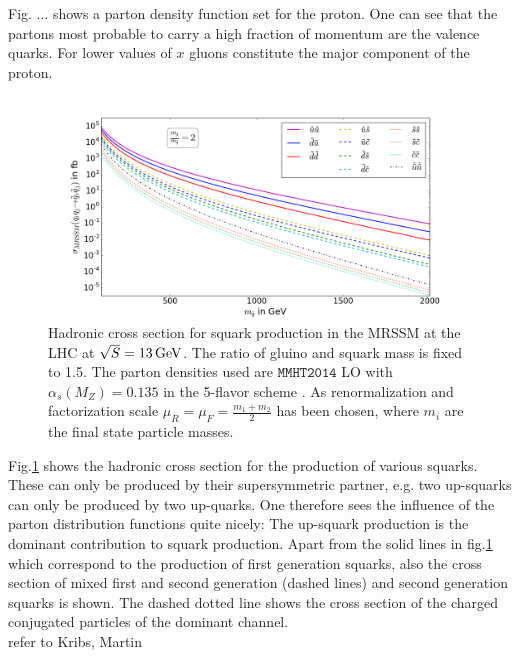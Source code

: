 Fig. ... shows a parton density function set for the proton. One can see that the partons most probable to carry a high fraction of momentum are the valence quarks. For lower values of $x$ gluons constitute the major component of the proton.\\
\begin{figure}[!htpb]
\begin{center}
\includegraphics[scale=.45]{figures/MRSSM:q+q->sq+sq_mr=2_seperated}
\caption{Hadronic cross section for squark production in the MRSSM at the LHC at $\sqrt{S} = \unit[13]{GeV}$. The ratio of gluino and squark mass is fixed to 1.5. The parton densities used are $\mathtt{MMHT2014}$ LO with $\alpha_s(M_Z) = 0.135$ in the 5-flavor scheme \cite{Harland-Lang:2014zoa}. As renormalization and factorization scale $\mu_R = \mu_F = \frac{m_1 + m_2}{2}$ has been chosen, where $m_i$ are the final state particle masses.} \label{fig:TreeXsection}
\end{center}
\end{figure}
Fig.\ref{fig:TreeXsection} shows the hadronic cross section for the production of various squarks. These can only be produced by their supersymmetric partner, e.g. two up-squarks can only be produced by two up-quarks. One therefore sees the influence of the parton distribution functions quite nicely: The up-squark production is the dominant contribution to squark production. Apart from the solid lines in fig.\ref{fig:TreeXsection} which correspond to the production of first generation squarks, also the cross section of mixed first and second generation (dashed lines) and second generation squarks is shown. The dashed dotted line shows the cross section of the charged conjugated particles of the dominant channel.\\
refer to Kribs, Martin
